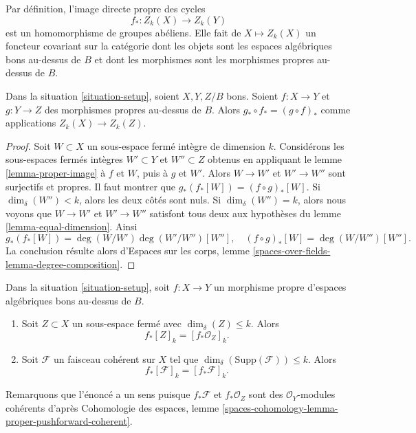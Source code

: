 \noindent
Par définition, l'image directe propre des cycles
$$
f_* : Z_k(X) \longrightarrow Z_k(Y)
$$
est un homomorphisme de groupes abéliens. Elle fait de $X \mapsto Z_k(X)$ un
foncteur covariant sur la catégorie dont les objets sont les espaces
algébriques bons au-dessus de $B$ et dont les morphismes sont les morphismes
propres au-dessus de $B$.

\begin{lemma}
\label{lemma-compose-pushforward}
Dans la situation \ref{situation-setup}, soient $X, Y, Z/B$ bons. Soient $f
: X \to Y$ et $g : Y \to Z$ des morphismes propres au-dessus de $B$. Alors $g_* \circ
f_* = (g \circ f)_*$ comme applications $Z_k(X) \to Z_k(Z)$.
\end{lemma}

\begin{proof}
Soit $W \subset X$ un sous-espace fermé intègre de dimension $k$. Considérons
les sous-espaces fermés intègres $W' \subset Y$ et $W'' \subset Z$ obtenus en
appliquant le lemme \ref{lemma-proper-image} à $f$ et $W$, puis à $g$ et $W'$.
Alors $W \to W'$ et $W' \to W''$ sont surjectifs et propres. Il faut montrer
que $g_*(f_*[W]) = (f \circ g)_*[W]$. Si $\dim_\delta(W'') <
k$, alors les deux côtés sont nuls. Si $\dim_\delta(W'') = k$, alors nous
voyons que $W \to W'$ et $W' \to W''$ satisfont tous deux aux hypothèses du
lemme \ref{lemma-equal-dimension}. Ainsi
$$
g_*(f_*[W]) = \deg(W/W')\deg(W'/W'')[W''],
\quad
(f \circ g)_*[W] = \deg(W/W'')[W''].
$$
La conclusion résulte alors d'Espaces sur les corps, lemme
\ref{spaces-over-fields-lemma-degree-composition}.
\end{proof}

\begin{lemma}
\label{lemma-cycle-push-sheaf}
Dans la situation \ref{situation-setup}, soit $f : X \to Y$ un morphisme
propre d'espaces algébriques bons au-dessus de $B$.
\begin{enumerate}
\item Soit $Z \subset X$ un sous-espace fermé avec $\dim_\delta(Z) \leq k$.
Alors
$$
f_*[Z]_k = [f_*{\mathcal O}_Z]_k.
$$
\item Soit $\mathcal{F}$ un faisceau cohérent sur $X$ tel que
$\dim_\delta(\text{Supp}(\mathcal{F})) \leq k$. Alors
$$
f_*[\mathcal{F}]_k = [f_*{\mathcal F}]_k.
$$
\end{enumerate}
Remarquons que l'énoncé a un sens puisque $f_*\mathcal{F}$ et $f_*\mathcal{O}_Z$
sont des $\mathcal{O}_Y$-modules cohérents d'après Cohomologie des espaces, lemme
\ref{spaces-cohomology-lemma-proper-pushforward-coherent}.
\end{lemma}

